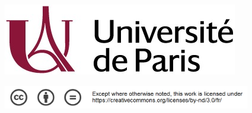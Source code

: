 \begin{titlepage}

\begin{figure}[t]
	\includegraphics[width=0.25\linewidth]{logos/Logo_Universite_Paris.png} 
\end{figure}

\begin{figure}[b]
	\includegraphics[width=108.2mm]{logos/creative_commons_pas_de_modifs.png} 
\end{figure}

\end{titlepage}